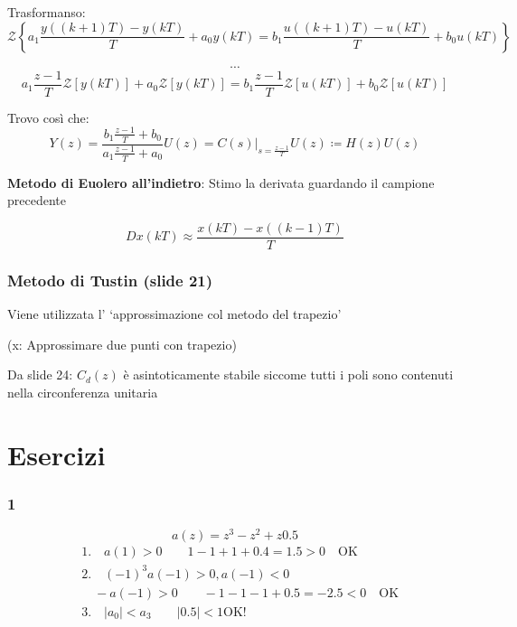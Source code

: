 \documentclass{article}
\begin{document}
Trasformanso:
\[ \mathcal{Z}\left\{a_1 \frac{y((k+1)T) - y(kT)}{T} + a_0 y(kT) = b_1\frac{u((k+1)T) - u(kT)}{T} + b_0u(kT)\right\}\]

\[ \cdots\]
\[ a_1 \frac{z-1}{T} \mathcal{Z}[y(kT)] + a_0 \mathcal{Z}[y(kT)] = b_1 \frac{z-1}{T} \mathcal{Z}[u(kT)] + b_0 \mathcal{Z}[u(kT)]\]

Trovo cos\`i che:
\[ Y(z) = \frac{b_1\frac{z-1}{T} + b_0}{a_1\frac{z-1}{T} + a_0} U(z) = \left.C(s)\right|_{s=\frac{z-1}{T}} U(z) \coloneqq H(z)U(z)\]

\bigbreak

\textbf{Metodo di Euolero all'indietro}: Stimo la derivata guardando il campione precedente

\[ Dx(kT) \approx \frac{x(kT) - x((k-1)T)}{T}\]

\subsubsection{Metodo di Tustin (slide 21)}
Viene utilizzata l' `approssimazione col metodo del trapezio'


(x: Approssimare due  punti con trapezio)

Da slide 24: $C_d(z)$ \`e asintoticamente stabile siccome tutti i poli sono contenuti nella circonferenza unitaria






\newpage
\section{Esercizi}


\subsubsection{1}

\[ a(z) = z^3 - z^2 + z  0.5 \]
\begin{align*}
    &1.\quad a(1) > 0 \qquad 1 - 1 + 1 + 0.4 = 1.5 > 0 \quad \text{OK}\\
    &2.\quad (-1)^3 a(-1) > 0, a(-1) < 0\\
    & \quad -a(-1) > 0 \qquad -1 -1 -1 +0.5 = -2.5 < 0 \quad \text{OK}\\
    &3.\quad  |a_0| < a_3 \qquad |0.5| < 1 \text{OK!}
\end{align*}
\end{document}
